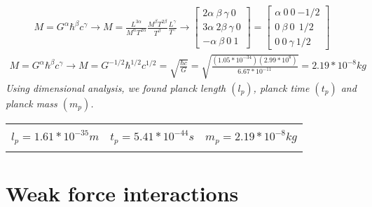 \documentclass{article}
\begin{document}
{
\begin{gather*}
	M = G^{\alpha} \hbar^{\beta} c^{\gamma} \rightarrow M = \frac{L^{3\alpha}}{M^{\alpha}T^{2\alpha}} \frac{M^{\beta}T^{2\beta}}{T^{\beta}} \frac{L^{\gamma}}{T^{\gamma}} \rightarrow \begin{bmatrix}
		2\alpha 	\ \beta \ 	\gamma \ 0 \\		
		3\alpha 	\ 2\beta \ 	\gamma \ 0 \\
		-\alpha 	\ \beta \ 0 \ 1
	\end{bmatrix} = \begin{bmatrix}
	\alpha \ 0 \ 0  \ {-1/2} \\
	 0 \ \beta \ 0 \ \ {1/2}\\
	0 \ 0 \ \gamma  \ {1/2}
\end{bmatrix} 
\end{gather*}
\begin{gather*}
M = G^{\alpha} \hbar^{\beta} c^{\gamma} \rightarrow M = G^{-1/2} \hbar^{1/2} c^{1/2} = \sqrt{\frac{\hbar c}{G}} = \sqrt{\frac{(1.05*10^{-34})(2.99*10^8)}{6.67*10^{-11}}} = 2.19*10^{-8}kg
\end{gather*}
\textit{Using dimensional analysis, we found planck length $(l_{p})$, planck time $(t_{p})$ and planck mass $(m_{p})$.}
    \begin{center}
	\begin{tabular}{ |c | c | c | }
		\hline
		&&\\
		$l_{p} = 1.61*10^{-35}m$  &  $t_{p} = 5.41*10^{-44}s$ & $m_{p} = 2.19*10^{-8}kg$\\
		&&\\
		\hline
	\end{tabular} 
\end{center}

\section{Weak force interactions}

\begin{center}
\end{center}}
\end{document}
